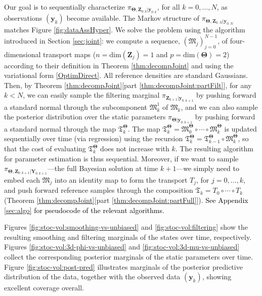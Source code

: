 \documentclass[twoside,11pt]{article}
\newcommand{\Yb}{\boldsymbol{Y}}
\newcommand{\yb}{\boldsymbol{y}}
\newcommand{\Zb}{\boldsymbol{Z}}
\newcommand{\vhyp}{\boldsymbol{\Theta}}
\newcommand{\submap}{\mathfrak{M}}
\newcommand{\hrevone}{\textcolor{black} }
\begin{document}
Our goal is to sequentially characterize
%
%
$\pi_{\vhyp,\Zb_{0:k} \vert \yb_{0:k}}$, for all 
$k=0,\ldots,N$, as observations $(\yb_k)$ become 
available. 
The Markov structure of $\pi_{\vhyp,\Zb_{0:N} \vert \yb_{0:N}}$
matches
Figure \ref{fig:dataAssHyper}. 
We solve the problem using the algorithm introduced in Section \ref{sec:joint}: 
we compute a sequence, $(\submap_j)_{j=0}^{N-1}$,
of four-dimensional transport maps 
($n = \text{dim}(\Zb_j)=1$ and $p = \text{dim}(\vhyp)=2$) according to their definition 
in Theorem \ref{thm:decompJoint} and using the
variational form \eqref{OptimDirect}. 
All reference densities are standard Gaussians.
Then, by Theorem \ref{thm:decompJoint}[part \ref{thm:decompJoint:partFilt}], 
for any $k < N$, we can easily sample %
the filtering
marginal $\pi_{\Zb_{k+1} \vert \yb_{0:k+1}}$  by pushing forward
a standard normal through the subcomponent $\submap_k^1$ of $\submap_k$,
and we can also sample  the posterior distribution over the
static parameters $\pi_{ \vhyp \vert \yb_{0:k+1}}$ by pushing forward a 
standard normal through the map $\mathfrak{T}^{\vhyp}_{k}$. 
The map $\mathfrak{T}^{\vhyp}_{k} = \submap_{0}^{\vhyp} \circ \cdots \circ \submap_{k}^{\vhyp}$ 
is updated sequentially over time (via
regression) using the
recursion $\mathfrak{T}^{\vhyp}_{k} = \mathfrak{T}^{\vhyp}_{k-1} \circ 
\submap_{k}^{\vhyp}$, so that the
cost of evaluating $\mathfrak{T}^{\vhyp}_{k}$ does not increase with $k$.
The resulting algorithm for parameter estimation is thus sequential.
Moreover, 
if we want to sample  
$\pi_{\vhyp,\Zb_{0:k+1} \vert \Yb_{0:k+1}}$---the full
Bayesian solution at time $k+1$---we simply need to embed 
%
each $\submap_j$
%
into an identity map to form the
%
transport $T_j$,
%
for $j=0,\ldots,k$,
%
and push forward reference samples 
%
through the composition 
$\mathfrak{T}_k = T_0 \circ \cdots \circ T_k$
(Theorem \ref{thm:decompJoint}[part \ref{thm:decompJoint:partFull}]).
\hrevone{See Appendix \ref{sec:algo} for pseudocode of the relevant algorithms.}

Figures \ref{fig:stoc-vol:smoothing-vs-unbiased}
and \ref{fig:stoc-vol:filtering} %
 show the resulting
smoothing and filtering marginals
%
of the states over time, respectively. 
Figures  \ref{fig:stoc-vol:3d-phi-vs-unbiased} and
\ref{fig:stoc-vol:3d-mu-vs-unbiased}
collect the corresponding posterior marginals of
the static parameters over time.
%
%
%
Figure \ref{fig:stoc-vol:post-pred} 
illustrates marginals of the posterior predictive distribution of the data, together with
the observed data $(\yb_k)$, showing excellent coverage overall.
\end{document}

